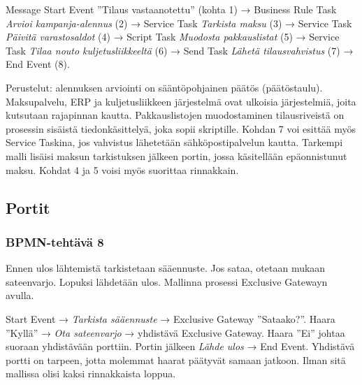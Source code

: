 \documentclass[
  finnish,
  letterpaper,
  DIV=11,
  numbers=noendperiod,
  oneside]{scrreprt}
\begin{document}
\begin{tcolorbox}[enhanced jigsaw, arc=.35mm, bottomrule=.15mm, bottomtitle=1mm, breakable, colback=white, colbacktitle=quarto-callout-tip-color!10!white, colframe=quarto-callout-tip-color-frame, coltitle=black, left=2mm, leftrule=.75mm, opacityback=0, opacitybacktitle=0.6, rightrule=.15mm, title=\textcolor{quarto-callout-tip-color}{\faLightbulb}\hspace{0.5em}{Malliratkaisu}, titlerule=0mm, toprule=.15mm, toptitle=1mm]

Message Start Event ''Tilaus vastaanotettu'' (kohta 1) → Business Rule
Task \emph{Arvioi kampanja-alennus} (2) → Service Task \emph{Tarkista
maksu} (3) → Service Task \emph{Päivitä varastosaldot} (4) → Script Task
\emph{Muodosta pakkauslistat} (5) → Service Task \emph{Tilaa nouto
kuljetusliikkeeltä} (6) → Send Task \emph{Lähetä tilausvahvistus} (7) →
End Event (8).

Perustelut: alennuksen arviointi on sääntöpohjainen päätös
(päätöstaulu). Maksupalvelu, ERP ja kuljetusliikkeen järjestelmä ovat
ulkoisia järjestelmiä, joita kutsutaan rajapinnan kautta.
Pakkauslistojen muodostaminen tilausriveistä on prosessin sisäistä
tiedonkäsittelyä, joka sopii skriptille. Kohdan 7 voi esittää myös
Service Taskina, jos vahvistus lähetetään sähköpostipalvelun kautta.
Tarkempi malli lisäisi maksun tarkistuksen jälkeen portin, jossa
käsitellään epäonnistunut maksu. Kohdat 4 ja 5 voisi myös suorittaa
rinnakkain.

\end{tcolorbox}

\subsection{Portit}\label{portit-1}

\subsubsection{BPMN-tehtävä 8}\label{bpmn-tehtuxe4vuxe4-8}

Ennen ulos lähtemistä tarkistetaan sääennuste. Jos sataa, otetaan mukaan
sateenvarjo. Lopuksi lähdetään ulos. Mallinna prosessi Exclusive
Gatewayn avulla.

\begin{tcolorbox}[enhanced jigsaw, arc=.35mm, bottomrule=.15mm, bottomtitle=1mm, breakable, colback=white, colbacktitle=quarto-callout-tip-color!10!white, colframe=quarto-callout-tip-color-frame, coltitle=black, left=2mm, leftrule=.75mm, opacityback=0, opacitybacktitle=0.6, rightrule=.15mm, title=\textcolor{quarto-callout-tip-color}{\faLightbulb}\hspace{0.5em}{Malliratkaisu}, titlerule=0mm, toprule=.15mm, toptitle=1mm]

Start Event → \emph{Tarkista sääennuste} → Exclusive Gateway
''Sataako?''. Haara ''Kyllä'' → \emph{Ota sateenvarjo} → yhdistävä
Exclusive Gateway. Haara ''Ei'' johtaa suoraan yhdistävään porttiin.
Portin jälkeen \emph{Lähde ulos} → End Event. Yhdistävä portti on
tarpeen, jotta molemmat haarat päätyvät samaan jatkoon. Ilman sitä
mallissa olisi kaksi rinnakkaista loppua.

\end{tcolorbox}
\end{document}
